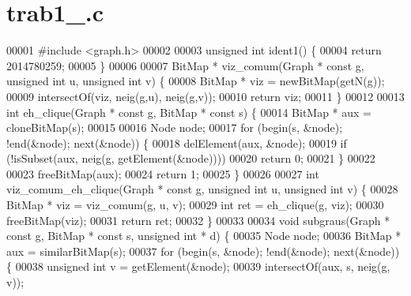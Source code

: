 \section{trab1\+\_.\+c}
\label{trab1__2014780259_8c_source}

\begin{DoxyCode}
00001 \textcolor{preprocessor}{#include <graph.h>}
00002 
00003 \textcolor{keywordtype}{unsigned} \textcolor{keywordtype}{int} ident1() \{
00004         \textcolor{keywordflow}{return} 2014780259;
00005 \}
00006 
00007 BitMap * viz_comum(Graph * \textcolor{keyword}{const} g, \textcolor{keywordtype}{unsigned} \textcolor{keywordtype}{int} u, \textcolor{keywordtype}{unsigned} \textcolor{keywordtype}{int} v) \{
00008         BitMap * viz = newBitMap(getN(g));
00009         intersectOf(viz, neig(g,u), neig(g,v));
00010         \textcolor{keywordflow}{return} viz;
00011 \}
00012 
00013 \textcolor{keywordtype}{int} eh_clique(Graph * \textcolor{keyword}{const} g, BitMap * \textcolor{keyword}{const} s) \{
00014         BitMap * aux = cloneBitMap(s);
00015 
00016         Node node;
00017         \textcolor{keywordflow}{for} (begin(s, &node); !end(&node); next(&node)) \{
00018                 delElement(aux, &node);
00019                 \textcolor{keywordflow}{if} (!isSubset(aux, neig(g, getElement(&node))))
00020                         \textcolor{keywordflow}{return} 0;
00021         \}
00022 
00023         freeBitMap(aux);
00024         \textcolor{keywordflow}{return} 1;
00025 \}
00026 
00027 \textcolor{keywordtype}{int} viz_comum_eh_clique(Graph * \textcolor{keyword}{const} g, \textcolor{keywordtype}{unsigned} \textcolor{keywordtype}{int} u, \textcolor{keywordtype}{unsigned} \textcolor{keywordtype}{int} v) \{
00028         BitMap * viz = viz_comum(g, u, v);
00029         \textcolor{keywordtype}{int} ret = eh_clique(g, viz);
00030         freeBitMap(viz);
00031         \textcolor{keywordflow}{return} ret;
00032 \}
00033 
00034 \textcolor{keywordtype}{void} subgraus(Graph * \textcolor{keyword}{const} g, BitMap * \textcolor{keyword}{const} s, \textcolor{keywordtype}{unsigned} \textcolor{keywordtype}{int} * d) \{
00035         Node node;
00036         BitMap * aux = similarBitMap(s);
00037         \textcolor{keywordflow}{for} (begin(s, &node); !end(&node); next(&node)) \{
00038                 \textcolor{keywordtype}{unsigned} \textcolor{keywordtype}{int} v = getElement(&node);
00039                 intersectOf(aux, s, neig(g, v));

\end{DoxyCode}
